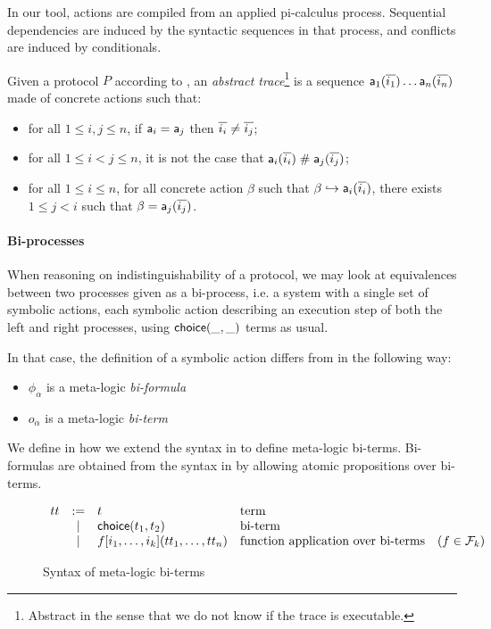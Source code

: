 In our tool, actions are compiled from an applied pi-calculus process.
Sequential dependencies are induced by the syntactic sequences in that
process, and conflicts are induced by conditionals.

\begin{definition}
  \label{def:trace}
  Given a protocol $P$ according to , an \emph{abstract trace}\footnote{Abstract in the sense that we do not know if the trace is executable.} is a sequence $\textsf{a}_1(\overline{i_1}) \dots \textsf{a}_n(\overline{i_n})$ made of concrete actions such that:
  \begin{itemize}
    \item for all $1 \leq i,j \leq n$, if $\textsf{a}_i = \textsf{a}_j$ then $\overline{i_i} \neq \overline{i_j}$;
    \item for all $1 \leq i < j \leq n$, it is not the case that $\textsf{a}_i(\overline{i_i}) \mathrel{\#} \textsf{a}_j(\overline{i_j})$;
    \item for all $1 \leq i \leq n$, for all concrete action $\beta$ such that $\beta \hookrightarrow \textsf{a}_i(\overline{i_i})$, there exists $1 \leq j < i$ such that $\beta = \textsf{a}_j(\overline{i_j})$.
  \end{itemize}
\end{definition}

\paragraph{Bi-processes}

When reasoning on indistinguishability of a protocol, we may look at equivalences
between two processes given as a bi-process, i.e. a system with a single set of
symbolic actions, each symbolic action describing an execution step of both the
left and right processes, using $\mathsf{choice}(\_,\_)$ terms as usual.

In that case, the definition of a symbolic action differs from 
in the following way:
\begin{itemize}
  \item $\phi_{\alpha}$ is a meta-logic \emph{bi-formula}
  \item $o_{\alpha}$ is a meta-logic \emph{bi-term}
\end{itemize}

We define in  how we extend the syntax in 
to define meta-logic bi-terms.
Bi-formulas are obtained from the syntax in  by allowing
atomic propositions over bi-terms.

\begin{figure}[h]
  \[
  \begin{array}{rclll}
    tt  & := & t &\text{term} & \\
        & \mid & \mathsf{choice}(t_1,t_2) &\text{bi-term} & \\
        & \mid & f[i_1,\ldots,i_k](tt_1,\dots,tt_n) &\text{function application over bi-terms} & (f\in\mathcal{F}_k)\\
  \end{array}
  \]
  \caption{Syntax of meta-logic bi-terms}\label{fig:bi-terms}
\end{figure}

